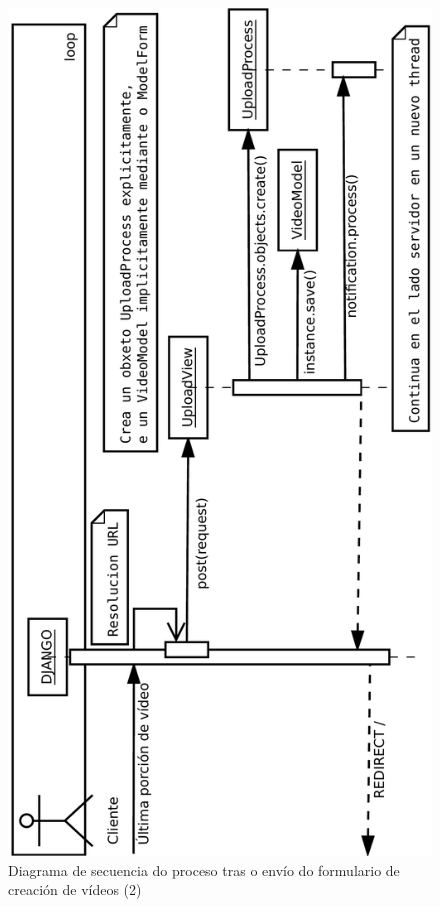         \begin{figure}[htp]
        \begin{center}
            \includegraphics[scale=0.45]{figures/FinSubidaVideo.pdf}
            \caption{Diagrama de secuencia do proceso tras o envío do formulario 
            de creación de vídeos (2)}
        \label{fig:FinSubidaVideo}
        \end{center}
        \end{figure}
                
